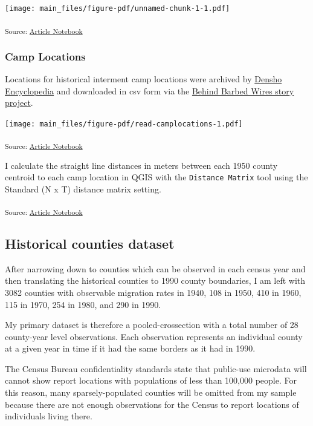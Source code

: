 \documentclass[
]{article}
\begin{document}
\texttt{[image: main\_files/figure-pdf/unnamed-chunk-1-1.pdf]}

\textsubscript{Source:
\href{https://dyasui.github.io/FieldPaper_new/main.qmd.html}{Article
Notebook}}

\subsubsection{Camp Locations}\label{camp-locations}

Locations for historical interment camp locations were archived by
\href{http://encyclopedia.densho.org/War_Relocation_Authority/\#Planning_the_Camps}{Densho
Encyclopedia} and downloaded in csv form via the
\href{https://www.arcgis.com/home/item.html?id=69183af8d45d4f46a9dc4eba99440891}{Behind
Barbed Wires story project}.

\texttt{[image: main\_files/figure-pdf/read-camplocations-1.pdf]}

\textsubscript{Source:
\href{https://dyasui.github.io/FieldPaper_new/main.qmd.html}{Article
Notebook}}

I calculate the straight line distances in meters between each 1950
county centroid to each camp location in QGIS with the
\texttt{Distance\ Matrix} tool using the Standard (N x T) distance
matrix setting.

\textsubscript{Source:
\href{https://dyasui.github.io/FieldPaper_new/main.qmd.html}{Article
Notebook}}

\subsection{Historical counties
dataset}\label{historical-counties-dataset}

After narrowing down to counties which can be observed in each census
year and then translating the historical counties to 1990 county
boundaries, I am left with 3082 counties with observable migration rates
in 1940, 108 in 1950, 410 in 1960, 115 in 1970, 254 in 1980, and 290 in
1990.

My primary dataset is therefore a pooled-crossection with a total number
of 28 county-year level observations. Each observation represents an
individual county at a given year in time if it had the same borders as
it had in 1990.

The Census Bureau confidentiality standards state that public-use
microdata will cannot show report locations with populations of less
than 100,000 people. For this reason, many sparsely-populated counties
will be omitted from my sample because there are not enough observations
for the Census to report locations of individuals living there.
\end{document}
